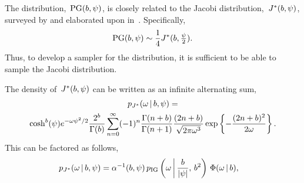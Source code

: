 The \polyagamma distribution,~$\mathrm{PG}(b,\psi)$, is closely related 
to the Jacobi distribution,~$J^{*}(b,\psi)$, surveyed by \citet{biane2001probability} and 
elaborated upon in~\citet{windle2014sampling}.
Specifically, 
\begin{align*}
  \mathrm{PG}(b, \psi) \sim \frac{1}{4} J^{*}(b, \tfrac{\psi}{2}).
\end{align*}
Thus, to develop a sampler for the \polyagamma distribution, 
it is sufficient to be able to sample the Jacobi distribution.

The density of~$J^{*}(b,\psi)$ can be written as an infinite alternating sum,
\begin{multline*}
  p_{J^{*}}({\omega} \,|\, b, \psi) = \\ 
  \cosh^b(\psi) e^{-{\omega} \psi^2/2} \frac{2^b}{\Gamma(b)} 
  \sum_{n=0}^\infty (-1)^n \frac{\Gamma(n+b)}{\Gamma(n+1)} \frac{(2n+b)}{\sqrt{2\pi {\omega}^3}}
  \exp\left\{- \frac{(2n+b)^2}{2{\omega}} \right\}.
\end{multline*}
This can be factored as follows,
\begin{align*}
  p_{J^{*}}({\omega} \,|\, b,\psi) &= 
   \alpha^{-1}(b,\psi) \,
   p_{\mathrm{IG}}\left({\omega} \, \bigg| \, \frac{b}{|\psi|}, \, b^2 \right) \,
   \Phi({\omega} \,|\, b),
\end{align*}
